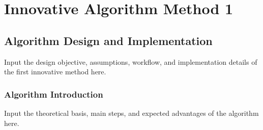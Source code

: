 \chapter{Innovative Algorithm Method 1}

\section{Algorithm Design and Implementation}
Input the design objective, assumptions, workflow, and implementation details of the first innovative method here.

\subsection{Algorithm Introduction}
Input the theoretical basis, main steps, and expected advantages of the algorithm here.
